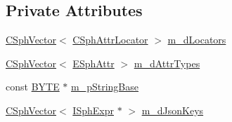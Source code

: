 \subsection*{Private Attributes}
\begin{DoxyCompactItemize}
\item 
\hyperlink{classCSphVector}{C\-Sph\-Vector}$<$ \hyperlink{structCSphAttrLocator}{C\-Sph\-Attr\-Locator} $>$ \hyperlink{classCSphGrouperMulti_a5a8eeb52b7af8c2b435b50a099e5ca33}{m\-\_\-d\-Locators}
\item 
\hyperlink{classCSphVector}{C\-Sph\-Vector}$<$ \hyperlink{sphinxexpr_8h_aa883df0db2e4468a107fdd2d2ae625a3}{E\-Sph\-Attr} $>$ \hyperlink{classCSphGrouperMulti_a3aa81b108ba3b823306b1c13d9794970}{m\-\_\-d\-Attr\-Types}
\item 
const \hyperlink{sphinxstd_8h_a4ae1dab0fb4b072a66584546209e7d58}{B\-Y\-T\-E} $\ast$ \hyperlink{classCSphGrouperMulti_a4bcb26aa0140e30669879e70d7b3b029}{m\-\_\-p\-String\-Base}
\item 
\hyperlink{classCSphVector}{C\-Sph\-Vector}$<$ \hyperlink{structISphExpr}{I\-Sph\-Expr} $\ast$ $>$ \hyperlink{classCSphGrouperMulti_afe1e33632cebf73222002de583dfe638}{m\-\_\-d\-Json\-Keys}
\end{DoxyCompactItemize}


